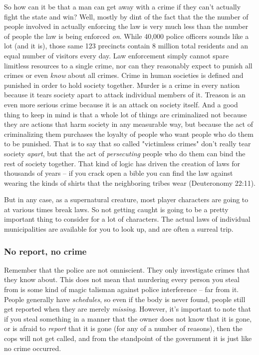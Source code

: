 So how can it be that a man can get away with a crime if they can't actually fight the state and win? Well, mostly by dint of the fact that the the number of people involved in actually enforcing the law is very much less than the number of people the law is being enforced \textit{on}. While 40,000 police officers sounds like a lot (and it is), those same 123 precincts contain 8 million total residents and an equal number of visitors every day. Law enforcement simply cannot spare limitless resources to a single crime, nor can they reasonably expect to punish all crimes or even \textit{know} about all crimes. Crime in human societies is defined and punished in order to hold society together. Murder is a crime in every nation because it tears society apart to attack individual members of it. Treason is an even more serious crime because it is an attack on society itself. And a good thing to keep in mind is that a whole lot of things are criminalized not because they are actions that harm society in any measurable way, but because the act of criminalizing them purchases the loyalty of people who want people who do them to be punished. That is to say that so called "victimless crimes" don't really tear society \textit{apart}, but that the act of \textit{persecuting} people who do them can bind the rest of society together. That kind of logic has driven the creation of laws for thousands of years -- if you crack open a bible you can find the law against wearing the kinds of shirts that the neighboring tribes wear (Deuteronomy 22:11).

But in any case, as a supernatural creature, most player characters are going to at various times break laws. So not getting caught is going to be a pretty important thing to consider for a lot of characters. The actual laws of individual municipalities are available for you to look up, and are often a surreal trip.

\subsubsection{No report, no crime}
\hspace{\parindent} Remember that the police are not omniscient. They only investigate crimes that they know about. This does not mean that murdering every person you steal from is some kind of magic talisman against police interference -- far from it. People generally have \textit{schedules}, so even if the body is never found, people still get reported when they are merely \textit{missing}. However, it's important to note that if you steal something in a manner that the owner does not know that it is gone, or is afraid to \textit{report} that it is gone (for any of a number of reasons), then the cops will not get called, and from the standpoint of the government it is just like no crime occurred.

